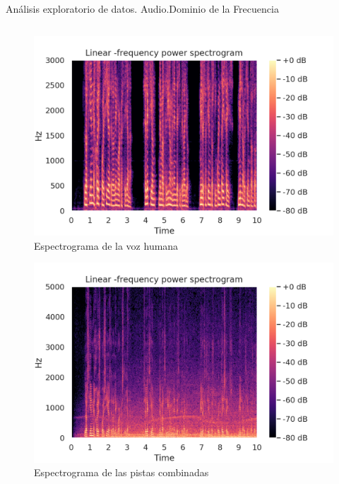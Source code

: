 \begin{frame}{Análisis exploratorio de datos. Audio.\newline Dominio de la Frecuencia}
	\begin{columns}
		\begin{column}{0.5\textwidth}
			\begin{figure}
				\centering
				\includegraphics[width=0.9\columnwidth]{../figures/audio_book_spectrogram.png}
				\vspace*{-5pt}
				\caption{Espectrograma de la voz humana}
				\label{fig: voice_spectral}
			\end{figure}
			\vspace*{-20pt}
			\begin{figure}
				\centering
				\includegraphics[width=0.9\columnwidth]{../figures/combination_spectrogram.png}
				\vspace*{-5pt}
				\caption{Espectrograma de las pistas combinadas}
				\label{fig: combination_spectral}
			\end{figure}
		\end{column}

\end{columns}
\end{frame}

